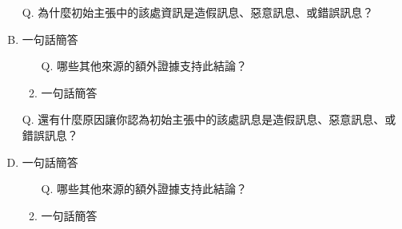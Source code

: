 \documentclass[a4paper, 12pt]{article}
\begin{document}
\begin{enumerate}[I.]
          \begin{enumerate}[A.]
              \item [Q.]為什麼{\color{blue}初始主張}中的該處資訊是造假訊息、惡意訊息、或錯誤訊息？
              \item {\color{gray}一句話簡答} %
                    \begin{enumerate}[1.]
                        \item [Q.]哪些其他來源的額外證據支持此結論？
                        \item {\color{gray}一句話簡答} %
                    \end{enumerate}
              \item [Q.]還有什麼原因讓你認為{\color{blue}初始主張}中的該處訊息是造假訊息、惡意訊息、或錯誤訊息？
              \item {\color{gray}一句話簡答} %
                    \begin{enumerate}[1.]
                        \item [Q.]哪些其他來源的額外證據支持此結論？
                        \item {\color{gray}一句話簡答} %
                    \end{enumerate}
          \end{enumerate}
\end{enumerate}

\end{document}
